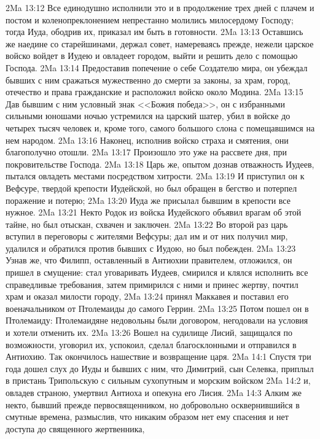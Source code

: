 \vs 2Ma 13:12 Все единодушно исполнили это и в продолжение трех дней с плачем и постом и коленопреклонением непрестанно молились милосердому Господу; тогда Иуда, ободрив их, приказал им быть в готовности.
\vs 2Ma 13:13 Оставшись же наедине со старейшинами, держал совет, намереваясь прежде, нежели царское войско войдет в Иудею и овладеет городом, выйти и решить дело с помощью Господа.
\vs 2Ma 13:14 Предоставив попечение о себе Создателю мира, он убеждал бывших с ним сражаться мужественно до смерти за законы, за храм, город, отечество и права гражданские и расположил войско около Модина.
\vs 2Ma 13:15 Дав бывшим с ним условный знак <<Божия победа>>, он с избранными сильными юношами ночью устремился на царский шатер, убил в войске до четырех тысяч человек и, кроме того, самого большого слона с помещавшимся на нем народом.
\vs 2Ma 13:16 Наконец, исполнив войско страха и смятения, они благополучно отошли.
\vs 2Ma 13:17 Произошло это уже на рассвете дня, при покровительстве Господа.
\vs 2Ma 13:18 Царь же, опытом дознав отважность Иудеев, пытался овладеть местами посредством хитрости.
\vs 2Ma 13:19 И приступил он к Вефсуре, твердой крепости Иудейской, но был обращен в бегство и потерпел поражение и потерю;
\vs 2Ma 13:20 Иуда же присылал бывшим в крепости все нужное.
\vs 2Ma 13:21 Некто Родок из войска Иудейского объявил врагам об этой тайне, но был отыскан, схвачен и заключен.
\vs 2Ma 13:22 Во второй раз царь вступил в переговоры с жителями Вефсуры; дал им и от них получил мир, удалился и обратился против бывших с Иудою, но был побежден.
\vs 2Ma 13:23 Узнав же, что Филипп, оставленный в Антиохии правителем, отложился, он пришел в смущение: стал уговаривать Иудеев, смирился и клялся исполнить все справедливые требования, затем примирился с ними и принес жертву, почтил храм и оказал милости городу,
\vs 2Ma 13:24 принял Маккавея и поставил его военачальником от Птолемаиды до самого Геррин.
\vs 2Ma 13:25 Потом пошел он в Птолемаиду: Птолемаидяне недовольны были договором, негодовали на условия и хотели отменить их.
\vs 2Ma 13:26 Вошел на судилище Лисий, защищался по возможности, уговорил их, успокоил, сделал благосклонными и отправился в Антиохию. Так окончилось нашествие и возвращение царя.
\vs 2Ma 14:1 Спустя три года дошел слух до Иуды и бывших с ним, что Димитрий, сын Селевка, приплыл в пристань Трипольскую с сильным сухопутным и морским войском
\vs 2Ma 14:2 и, овладев страною, умертвил Антиоха и опекуна его Лисия.
\rsbpar\vs 2Ma 14:3 Алким же некто, бывший прежде первосвященником, но добровольно осквернившийся в смутные времена, размыслив, что никаким образом нет ему спасения и нет доступа до священного жертвенника,
